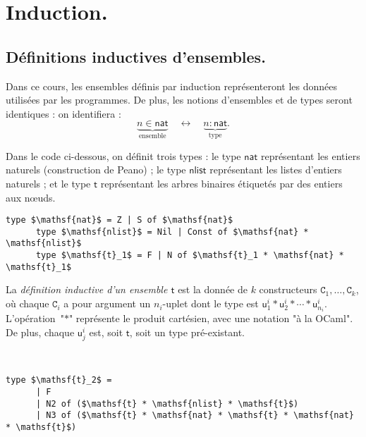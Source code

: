 \documentclass[../main]{subfiles}
\begin{document}
  \chapter{Induction.}\label{sec:induction}

  \minitoc

  \section{Définitions inductives d'ensembles.}

  Dans ce cours, les ensembles définis par induction représenteront les données utilisées par les programmes.
  De plus, les notions d'ensembles et de types seront identiques : on identifiera :
  \[
    \underbrace{n \in \mathsf{nat}}_\text{ensemble} \quad\longleftrightarrow\quad \underbrace{n : \mathsf{nat}}_\text{type}
  .\]

  \begin{exm}
    Dans le code ci-dessous, on définit trois types : le type $\mathsf{nat}$ représentant les entiers naturels (construction de Peano) ; le type $\mathsf{nlist}$ représentant les listes d'entiers naturels ; et le type $\mathsf{t}$ représentant les arbres binaires étiquetés par des entiers aux nœuds.

    \begin{lstlisting}[language=caml,caption=Trois types définis inductivement]
      type $\mathsf{nat}$ = Z | S of $\mathsf{nat}$
      type $\mathsf{nlist}$ = Nil | Const of $\mathsf{nat} * \mathsf{nlist}$
      type $\mathsf{t}_1$ = F | N of $\mathsf{t}_1 * \mathsf{nat} * \mathsf{t}_1$
    \end{lstlisting}
  \end{exm}

  \begin{defn}
    La \textit{définition inductive d'un ensemble $\mathsf{t}$} est la donnée de $k$ constructeurs $\mathtt{C}_1, \ldots, \mathtt{C}_k$, où chaque $\mathtt{C}_i$ a pour argument un $n_i$-uplet dont le type est $\mathsf{u}_1^i * \mathsf{u}_2^i * \cdots * \mathsf{u}_{n_i}^i$.
    L'opération~"$*$" représente le produit cartésien, avec une notation "à la OCaml".
    De plus, chaque $\mathsf{u}_j^i$ est, soit $\mathsf{t}$, soit un type pré-existant.
  \end{defn}

  \begin{exm}\label{exm:ind-t2-def}
    ~
    \begin{lstlisting}[language=caml,caption=Un exemple de type]
      type $\mathsf{t}_2$ =
      | F
      | N2 of ($\mathsf{t} * \mathsf{nlist} * \mathsf{t}$)
      | N3 of ($\mathsf{t} * \mathsf{nat} * \mathsf{t} * \mathsf{nat} * \mathsf{t}$)
    \end{lstlisting}
  \end{exm}
\end{document}
